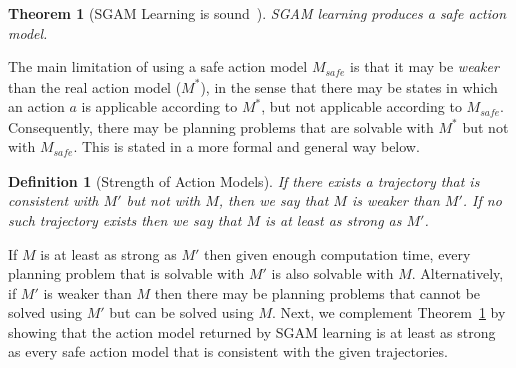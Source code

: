 \documentclass{article}
\newtheorem{theorem}{Theorem}
\newtheorem{definition}{Definition}
\newcommand{\pre}{\textit{pre}}
\newcommand{\eff}{\textit{eff}}
\newcommand{\realm}{\ensuremath{M^*}\xspace}
\begin{document}
\begin{theorem}[SGAM Learning is sound~\cite{stern2017efficientAndSafe}]
SGAM learning produces a safe action model. 
\label{thm:sam-safe-grounded}
\end{theorem}
The main limitation of using a safe action model $M_{\textit{safe}}$ is that it may be \emph{weaker} than the real action model (\realm), in the sense that there may be states in which an action $a$ is applicable according to \realm, but not applicable according to $M_{\textit{safe}}$. 
Consequently, there may be planning problems that are solvable with \realm but not with $M_{\textit{safe}}$. 
This is stated in a more formal and general way below. 
\begin{definition}[Strength of Action Models]
If there exists a trajectory that is consistent with $M'$ but not with $M$, then we say that $M$ is weaker than $M'$.
If no such trajectory exists then we say that $M$ is at least as strong as $M'$. 
\label{def:weakness}
\end{definition}
If $M$ is at least as strong as $M'$ then given enough computation time, every planning problem that is solvable with $M'$ is also solvable with $M$. 
Alternatively, if $M'$ is weaker than $M$ then there may be planning problems that cannot be solved using $M'$ but can be solved using $M$. 
Next, we complement Theorem~\ref{thm:sam-safe-grounded} by showing that the action model returned by SGAM learning is at least as strong as every safe action model that is consistent 
with the given trajectories. 
\end{document}
